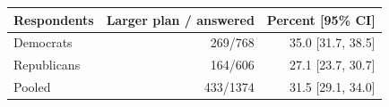 \begin{tabular}{lrr}
\toprule
Respondents & Larger plan / answered & Percent [95\% CI] \\
\midrule
Democrats & 269/768 & 35.0 [31.7, 38.5] \\
Republicans & 164/606 & 27.1 [23.7, 30.7] \\
Pooled & 433/1374 & 31.5 [29.1, 34.0] \\
\bottomrule
\end{tabular}
